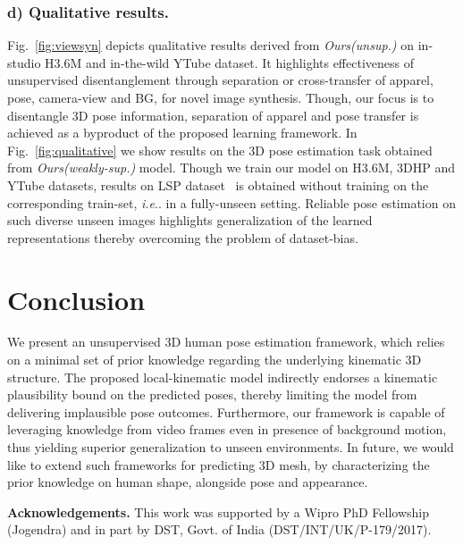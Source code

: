 \documentclass[letterpaper]{article} \usepackage{aaai20}  \usepackage{times}  \usepackage{helvet}  \usepackage{courier}  \usepackage{url}  \usepackage{graphicx}  \usepackage{amsmath}
\makeatletter
\DeclareRobustCommand\onedot{\futurelet\@let@token\@onedot}
\def\@onedot{\ifx\@let@token.\else.\null\fi\xspace}
\def\ie{\emph{i.e}\onedot} \def\Ie{\emph{I.e}\onedot}
\makeatother
\begin{document}
\subsubsection{d) Qualitative results.} Fig.~\ref{fig:viewsyn} depicts qualitative results derived from \textit{Ours(unsup.)} on in-studio H3.6M and in-the-wild YTube dataset. It highlights effectiveness of unsupervised disentanglement through separation or cross-transfer of apparel, pose, camera-view and BG, for novel image synthesis. Though, our focus is to disentangle 3D pose information, separation of apparel and pose transfer is achieved as a byproduct of the proposed learning framework. In Fig.~\ref{fig:qualitative} we show results on the 3D pose estimation task obtained from \textit{Ours(weakly-sup.)} model. Though we train our model on H3.6M, 3DHP and YTube datasets, results on LSP dataset~\cite{johnson2010clustered} is obtained without training on the corresponding train-set, \ie in a fully-unseen setting. Reliable pose estimation on such diverse unseen images highlights generalization of the learned representations thereby overcoming the problem of dataset-bias.


\section{Conclusion}




We present an unsupervised 3D human pose estimation framework, which relies on a minimal set of prior knowledge regarding the underlying kinematic 3D structure.
The proposed local-kinematic model indirectly endorses a kinematic plausibility bound on the predicted poses, thereby limiting the model from delivering implausible pose outcomes. Furthermore, our framework is capable of leveraging knowledge from video frames even in presence of background motion, thus yielding superior generalization to unseen environments. 
In future, we would like to extend such frameworks for predicting 3D mesh, by characterizing the prior knowledge on human shape, alongside pose and appearance. 






{
\noindent
\textbf{Acknowledgements.} This work was supported by a Wipro PhD Fellowship (Jogendra) and in part by DST, Govt. of India (DST/INT/UK/P-179/2017).}

{\small
  
  
}
\end{document}
